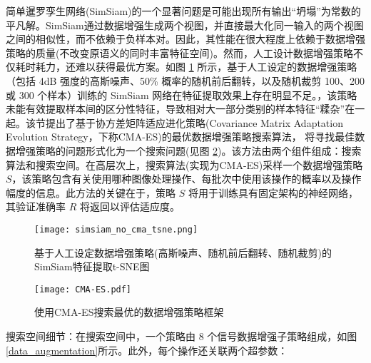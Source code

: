 \documentclass[master]{thesis-uestc}
\begin{document}
简单暹罗孪生网络(SimSiam)的一个显著问题是可能出现所有输出“坍塌”为常数的平凡解。SimSiam通过数据增强生成两个视图，并直接最大化同一输入的两个视图之间的相似性，而不依赖于负样本对。因此，其性能在很大程度上依赖于数据增强策略的质量(不改变原语义的同时丰富特征空间)。然而，人工设计数据增强策略不仅耗时耗力，还难以获得最优方案。如图 \ref{simsiam_no_cma_tsne} 所示，基于人工设定的数据增强策略（包括 4dB 强度的高斯噪声、50\% 概率的随机前后翻转，以及随机裁剪 100、200 或 300 个样本）训练的 SimSiam 网络在特征提取效果上存在明显不足。，该策略未能有效提取样本间的区分性特征，导致相对大一部分类别的样本特征“糅杂”在一起。该节提出了基于协方差矩阵适应进化策略(Covariance Matrix Adaptation Evolution Strategy，下称CMA-ES)的最优数据增强策略搜索算法，
将寻找最佳数据增强策略的问题形式化为一个搜索问题(见图 \ref{CMA-ES})。该方法由两个组件组成：搜索算法和搜索空间。在高层次上，搜索算法(实现为CMA-ES)采样一个数据增强策略 \( S \)，该策略包含有关使用哪种图像处理操作、每批次中使用该操作的概率以及操作幅度的信息。此方法的关键在于，策略 \( S \) 将用于训练具有固定架构的神经网络，其验证准确率 \( R \) 将返回以评估适应度。
\begin{figure}[h]
    \centering
    \texttt{[image: simsiam\_no\_cma\_tsne.png]}
    \caption{基于人工设定数据增强策略(高斯噪声、随机前后翻转、随机裁剪)的SimSiam特征提取t-SNE图}
    \label{simsiam_no_cma_tsne}
\end{figure}
\begin{figure}[h]
    \centering
    \texttt{[image: CMA-ES.pdf]}
    \caption{使用CMA-ES搜索最优的数据增强策略框架}
    \label{CMA-ES}
\end{figure}
搜索空间细节：在搜索空间中，一个策略由 8 个信号数据增强子策略组成，如图\ref{data_augmentation}所示。此外，每个操作还关联两个超参数：
\end{document}
